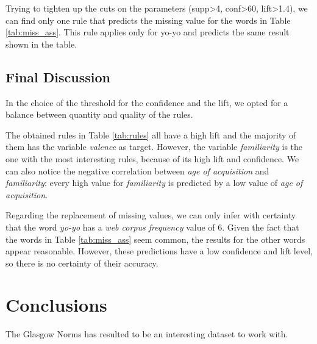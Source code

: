 \documentclass[a4paper,11pt,dvipsnames]{article}
\begin{document}
Trying to tighten up the cuts on the parameters (supp>4, conf>60, lift>1.4), we can find only one rule that predicts the missing value for the words in Table \ref{tab:miss_ass}. This rule applies only for yo-yo and predicts the same result shown in the table.


\subsection{Final Discussion}

In the choice of the threshold for the confidence and the lift, we opted for a balance between quantity and quality of the rules. 

The obtained rules in Table \ref{tab:rules} all have a high lift and the majority of them has the variable \textit{valence} as target. However, the variable \textit{familiarity} is the one with the most interesting rules, because of its high lift and confidence. We can also notice the negative correlation between \textit{age of acquisition} and \textit{familiarity}: every high value for \textit{familiarity} is predicted by a low value of \textit{age of acquisition}.

Regarding the replacement of missing values, we can only infer with certainty that the word \textit{yo-yo} has a \textit{web corpus frequency} value of 6. Given the fact that the words in Table \ref{tab:miss_ass} seem common, the results for the other words appear reasonable. However, these predictions have a low confidence and lift level, so there is no certainty of their accuracy.



\section{Conclusions}

The Glasgow Norms has resulted to be an interesting dataset to work with.
\end{document}
